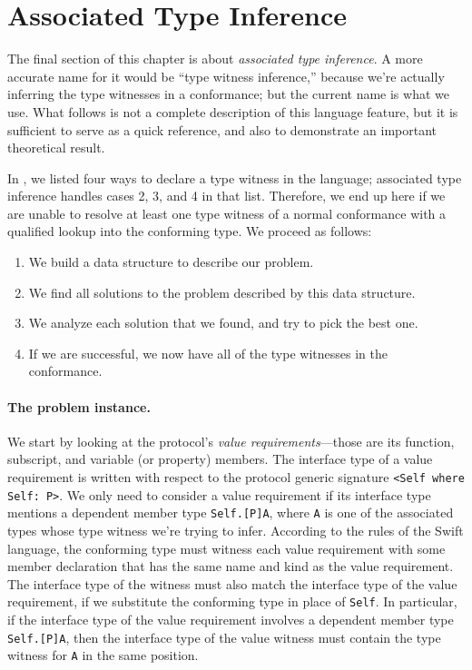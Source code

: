 \documentclass[../generics]{subfiles}
\begin{document}
\section{Associated Type Inference}\label{associated type inference}

The final section of this chapter is about \emph{associated type inference}. A more accurate name for it would be ``type witness inference,'' because we're actually inferring the type witnesses in a conformance; but the current name is what we use. What follows is not a complete description of this language feature, but it is sufficient to serve as a quick reference, and also to demonstrate an important theoretical result.

In , we listed four ways to declare a type witness in the language; associated type inference handles cases 2, 3, and 4 in that list. Therefore, we end up here if we are unable to resolve at least one type witness of a normal conformance with a qualified lookup into the conforming type. We proceed as follows:
\begin{enumerate}
\item We build a data structure to describe our problem.
\item We find all solutions to the problem described by this data structure.
\item We analyze each solution that we found, and try to pick the best one.
\item If we are successful, we now have all of the type witnesses in the conformance.
\end{enumerate}

\paragraph{The problem instance.}
We start by looking at the protocol's \emph{value requirements}---those are its function, subscript, and variable (or property) members. The interface type of a value requirement is written with respect to the protocol generic signature \verb|<Self where Self: P>|. We only need to consider a value requirement if its interface type mentions a dependent member type \texttt{Self.[P]A}, where \texttt{A} is one of the associated types whose type witness we're trying to infer. According to the rules of the Swift language, the conforming type must witness each value requirement with some member declaration that has the same name and kind as the value requirement. The interface type of the witness must also match the interface type of the value requirement, if we substitute the conforming type in place of \texttt{Self}. In particular, if the interface type of the value requirement involves a dependent member type \texttt{Self.[P]A}, then the interface type of the value witness must contain the type witness for \texttt{A} in the same position.
\end{document}
